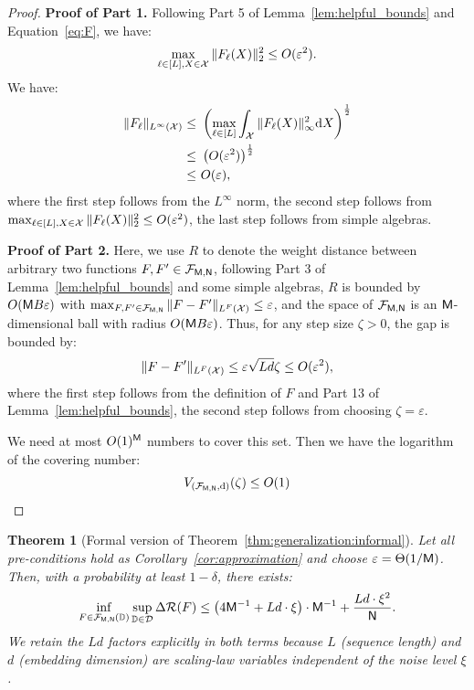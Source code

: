\documentclass[11pt]{article}
\theoremstyle{plain}
\newtheorem{theorem}{Theorem}[section]
\renewcommand{\d}{\mathrm{d}}
\begin{document}
\begin{proof}
    {\bf Proof of Part 1.} Following Part 5 of Lemma~\ref{lem:helpful_bounds} and Equation~\eqref{eq:F}, we have:
    \begin{align*}
        \max_{\ell \in [L], X \in {\cal X}}\| F_\ell(X) \|_2^2 \leq O(\varepsilon^2).
    \end{align*}
    We have:
    \begin{align*}
        \| F_{\ell} \|_{L^{\infty}({\cal X})} \leq & ~ \left(\max_{\ell \in [L]} \int_{\cal X} \| F_\ell(X) \|_\infty^2 \d X \right)^{\frac{1}{2}} \\
        \leq & ~ \left( O(\varepsilon^2) \right)^{\frac{1}{2}} \\
        \leq & ~  O(\varepsilon),
    \end{align*}
    where the first step follows from the $L^\infty$ norm, the second step follows from $\max_{\ell \in [L], X \in {\cal X}}\| F_\ell(X) \|_2^2 \leq O(\varepsilon^2)$, the last step follows from simple algebras.

    

    {\bf Proof of Part 2.} Here, we use $R$ to denote the weight distance between arbitrary two functions $F, F' \in {\cal F}_{\sf M, N}$, following Part 3 of Lemma~\ref{lem:helpful_bounds} and some simple algebras, $R$ is bounded by $O({\sf M}B\varepsilon)$ with $\max_{F, F' \in {\cal F}_{\sf M, N}} \|F - F'\|_{L^F({\cal X})} \leq \varepsilon$, and the space of ${\cal F}_{\sf M, N}$ is an $\sf M$-dimensional ball with radius $O({\sf M}B\varepsilon)$. Thus, for any step size $\zeta > 0$, the gap is bounded by:
    \begin{align*}
        \|F - F'\|_{L^F({\cal X})} \leq \varepsilon \sqrt{Ld} \zeta \leq O(\varepsilon^2),
    \end{align*}
    where the first step follows from the definition of $F$ and Part 13 of Lemma~\ref{lem:helpful_bounds}, the second step follows from choosing $\zeta = \varepsilon$.

    We need at most $O(1)^{\sf M}$ numbers to cover this set. 
    Then we have the logarithm of the covering number:
    \begin{align*}
        V_{({\cal F}_{\sf M, N}, {\rm d})}(\zeta) \leq O(1)
    \end{align*}
\end{proof}



\begin{theorem}[Formal version of Theorem~\ref{thm:generalization:informal}]\label{thm:generalization}
    Let all pre-conditions hold as Corollary~\ref{cor:approximation} and choose $\varepsilon = \Theta(1/{\sf M})$. Then, with a probability at least $1 - \delta$, there exists:
    \begin{align*}
        \inf_{F \in {\cal F}_{\sf M, N}(\mathbb{D})} \sup_{\mathbb{D} \in {\cal D}} \Delta{\cal R}(F) \leq \big(4{\sf M}^{-1} + Ld\cdot \xi\big) \cdot {\sf M}^{-1} + \frac{Ld \cdot\xi^2}{\sf N}.
    \end{align*}
    We retain the $Ld$ factors explicitly in both terms because $L$ (sequence length) and $d$ (embedding dimension) are scaling-law variables independent of the noise level $\xi$.
\end{theorem}
\end{document}
